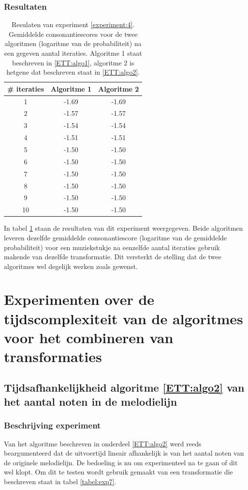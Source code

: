\subsubsection{Resultaten}
\begin{table}
  \centering
  \begin{tabular}{c | c | c }    
    \# iteraties & Algoritme 1 & Algoritme 2 \\
    \hline
    1 & -1.69 & -1.69\\
    2 & -1.57 & -1.57\\
    3 & -1.54 & -1.54\\
    4 & -1.51 & -1.51\\
    5 & -1.50 & -1.50\\
    6 & -1.50 & -1.50\\
    7 & -1.50 & -1.50\\
    8 & -1.50 & -1.50\\
    9 & -1.50 & -1.50\\
    10 & -1.50 & -1.50\\
  \end{tabular}
  \caption{Resulaten van experiment \ref{experiment:4}. Gemiddelde consonantiescores voor de twee algoritmen (logaritme van de probabiliteit) na een gegeven aantal iteraties. Algoritme 1 staat beschreven in \ref{ETT:algo1}, algoritme 2 is hetgene dat beschreven staat in \ref{ETT:algo2}.}
  \label{tabel:res4}
\end{table}

In tabel \ref{tabel:res4} staan de resultaten van dit experiment weergegeven. Beide algoritmen leveren dezelfde gemiddelde consonantiescore (logaritme van de gemiddelde probabiliteit) voor een muziekstukje na eenzelfde aantal iteraties gebruik makende van dezelfde transformatie. Dit versterkt de stelling dat de twee algoritmes wel degelijk werken zoals gewenst.

\section{Experimenten over de tijdscomplexiteit van de algoritmes voor het combineren van transformaties}
\subsection{Tijdsafhankelijkheid algoritme \ref{ETT:algo2} van het aantal noten in de melodielijn}
\label{experiment:7}
\subsubsection{Beschrijving experiment}
Van het algoritme beschreven in onderdeel \ref{ETT:algo2} werd reeds beargumenteerd dat de uitvoertijd lineair afhankelijk is van het aantal noten van de originele melodielijn. De bedoeling is nu om experimenteel na te gaan of dit wel klopt. Om dit te testen wordt gebruik gemaakt van een transformatie die beschreven staat in tabel \ref{tabel:exp7}.


